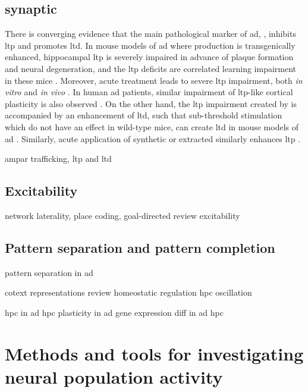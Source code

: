 \subsection{synaptic \label{ad.synaptic}}

There is converging evidence that the main pathological marker of \gls{ad}, \abeta, inhibits \gls{ltp} and promotes \gls{ltd}. In mouse models of \gls{ad} where \abeta production is transgenically enhanced, hippocampal \gls{ltp} is severely impaired in advance of plaque formation and neural degeneration, and the \gls{ltp} deficits are correlated learning impairment in these mice \citep{hsia99, chapman99, roberson11}. Moreover, acute \abeta treatment leads to severe \gls{ltp} impairment, both \textit{in vitro} \citep{lambert98, shankar08} and \textit{in vivo} \citep{walsh02, hu08}. In human \gls{ad} patients, similar impairment of \gls{ltp}-like cortical plasticity is also observed \citep{inghilleri06, koch12}. On the other hand, the \gls{ltp} impairment created by \abeta is accompanied by an enhancement of \gls{ltd}, such that sub-threshold stimulation which do not have an effect in wild-type mice, can create \gls{ltd} in mouse models of \gls{ad} \citep{hsia99, fitzjohn01, jocobsen06}. 
Similarly, acute application of synthetic or extracted \abeta similarly enhances \gls{ltp} \citep{hsieh06, li09}. 

\gls{ampar} trafficking, \gls{ltp} and \gls{ltd}

\subsection{Excitability}
    network laterality, place coding, goal-directed review\citep{kitanishi16}
    \citep{oh14} excitability
\subsection{Pattern separation and pattern completion}
\citep{palmer11} pattern separation in \gls{ad}

    \citep{smith14} cotext representations review
    homeostatic regulation \citep{mizumori13}
    \citep{draguhn14} hpc oscillation


\citep{moodley14} hpc in \gls{ad}
\citep{mufson15} hpc plasticity in \gls{ad}
\citep{saura15} gene expression diff in \gls{ad} hpc

\section{Methods and tools for investigating neural population activity}
